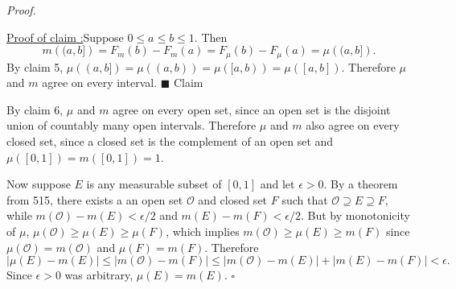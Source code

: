 \documentclass[12pt]{article}
\newcounter{ProofCounter}
\newcounter{ClaimCounter}[ProofCounter]
\newenvironment{Proof}{\stepcounter{ProofCounter}\textit{Proof.}}{\hfill$\square$}
\newenvironment{claim}[1]{\vspace{1mm}\stepcounter{ClaimCounter}\par\noindent\underline{\bf Claim \theClaimCounter:}\space#1}{}
\newenvironment{claimproof}[1]{\par\noindent\underline{Proof of claim \theClaimCounter:}\space#1}{\hfill $\blacksquare$ Claim \theClaimCounter}
\begin{document}
\begin{Proof}
\begin{claimproof}
Suppose $0 \leq a \leq b \leq 1$. Then 
\[ m\left( (a,b] \right) = F_{m}(b) - F_{m}(a) = F_{\mu}(b) - F_{\mu}(a) = \mu\left( (a,b] \right).\]
By claim 5, $\mu( (a,b] ) = \mu( (a,b) ) = \mu( [a,b) ) = \mu([a,b])$. Therefore $\mu$ and $m$ agree on every interval.
\end{claimproof}

By claim 6, $\mu$ and $m$ agree on every open set, since an open set is the disjoint union of countably many open intervals. Therefore $\mu$ and $m$
also agree on every closed set, since a closed set is the complement of an open set and $\mu([0,1]) = m([0,1]) = 1$.

Now suppose $E$ is any measurable subset of $[0,1]$ and let $\epsilon > 0$. By a theorem from 515, there exists a
an open set $\mathcal{O}$ and closed set $F$ such that $\mathcal{O} \supseteq E \supseteq F$, while $m(\mathcal{O}) - m(E) < \epsilon / 2$ and $m(E) - m(F)
< \epsilon / 2$. But by monotonicity of $\mu$, $\mu(\mathcal{O}) \geq \mu(E) \geq \mu(F)$, which implies $m(\mathcal{O}) \geq \mu(E) \geq m(F)$ since
$\mu(\mathcal{O}) = m(\mathcal{O})$ and $\mu(F) = m(F)$. Therefore 
\[ |\mu(E) - m(E)| \leq |m(\mathcal{O}) - m(F)| \leq |m(\mathcal{O}) - m(E)| + |m(E) - m(F)| < \epsilon. \]
Since $\epsilon > 0$ was arbitrary, $\mu(E) = m(E)$.
\end{Proof}
\end{document}
